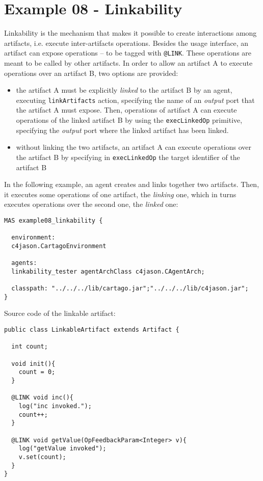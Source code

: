 \documentclass[11pt]{report}
\newcommand\code[1]{{\small{\mbox{\texttt{{#1}}}}}}
\begin{document}

\newpage
\section{Example 08 - Linkability}

Linkability is the mechanism that makes it possible to create interactions among artifacts, i.e. execute inter-artifacts operations.
%
Besides the usage interface, an artifact can expose operations -- to be tagged with \code{@LINK}.
%
These operations are meant to be called by other artifacts.
%
In order to allow an artifact A to execute operations over an artifact B, two options are provided:
%
\begin{itemize}
\item the artifact A must be explicitly \emph{linked} to the artifact B by an agent, executing \code{linkArtifacts} action, specifying the name of an \emph{output} port that the artifact A must expose.
%
Then, operations of artifact A can execute operations of the linked artifact B by using the \code{execLinkedOp} primitive, specifying the \emph{output} port where the linked artifact has been linked. 
%
\item without linking the two artifacts, an artifact A can execute operations over the artifact B by specifying in \code{execLinkedOp} the target identifier of the artifact B 
\end{itemize}
%
\medskip

\noindent In the following example, an agent creates and links together two artifacts. 
%
Then, it executes some operations of one artifact, the \emph{linking} one, which in turns executes operations over the second one, the \emph{linked} one:

{\small{
\begin{verbatim}
MAS example08_linkability {

  environment: 
  c4jason.CartagoEnvironment

  agents:  
  linkability_tester agentArchClass c4jason.CAgentArch;

  classpath: "../../../lib/cartago.jar";"../../../lib/c4jason.jar";    
}
\end{verbatim}}}

\noindent Source code of the linkable artifact:

{\small{\begin{verbatim}
public class LinkableArtifact extends Artifact {
  
  int count;
  
  void init(){
    count = 0;
  }
      
  @LINK void inc(){
    log("inc invoked.");
    count++;
  }

  @LINK void getValue(OpFeedbackParam<Integer> v){
    log("getValue invoked");
    v.set(count);
  }
}
\end{verbatim}}}
\end{document}
